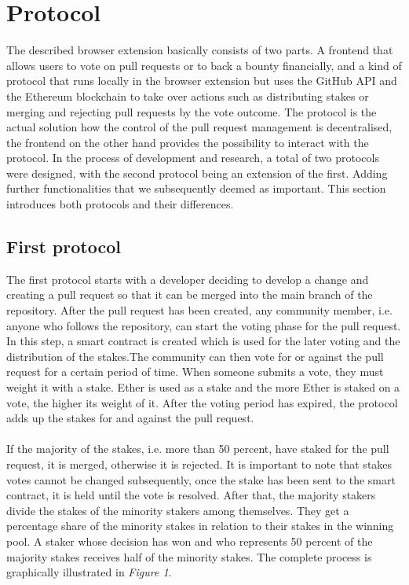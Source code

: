 \documentclass[sigconf]{acmart}
\begin{document}
\section{Protocol}
The described browser extension basically consists of two parts. A frontend that allows users to vote on pull requests or to back 
a bounty financially, and a kind of protocol that runs locally in the browser extension but uses the GitHub API and the Ethereum 
blockchain to take over actions such as distributing stakes or merging and rejecting pull requests by the vote outcome.
The protocol is the actual solution how the control of the pull request management is decentralised, the frontend on the 
other hand provides the possibility to interact with the protocol. In the process of development and research, a total of two 
protocols were designed, with the second protocol being an extension of the first. Adding further functionalities that we 
subsequently deemed as important. This section introduces both protocols and their differences.

\subsection{First protocol}
The first protocol starts with a developer deciding to develop a change and creating a pull request so that it can be merged into the 
main branch of the repository. After the pull request has been created, any community member, i.e. anyone who follows the repository, 
can start the voting phase for the pull request. In this step, a smart contract is created which is used for the later voting and the distribution
 of the stakes.The community can then vote for or against the pull request for a certain period of time.
When someone submits a vote, they must weight it with a stake. Ether is used as a stake and the more Ether is staked on a vote, 
the higher its weight of it. After the voting period has expired, the protocol adds up the stakes for and against the pull request. \\ \\
If the majority of the stakes, i.e. more than 50 percent, have staked for the pull request, it is merged, otherwise it is rejected.
It is important to note that stakes votes cannot be changed subsequently, once the stake has been sent to the smart contract, 
it is held until the vote is resolved.  After that, the majority stakers divide the stakes of the minority stakers among themselves. 
They get a percentage share of the minority stakes in relation to their stakes in the winning pool. A staker whose decision has won
 and who represents 50 percent of the majority stakes receives half of the minority stakes. The complete process is graphically 
illustrated in \textit{Figure 1}.
\end{document}
